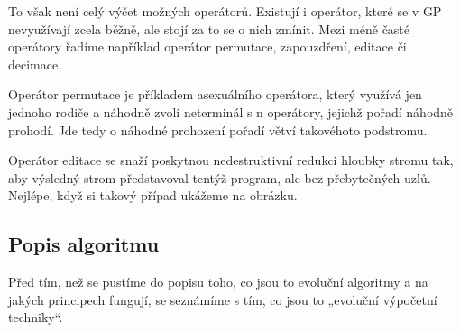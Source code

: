 \documentclass[bc,male,java,dept460]{diploma}		%
\begin{document}
To však není celý výčet možných operátorů. Existují i operátor, které se v GP nevyužívají zcela běžně, ale stojí za to se o nich zmínit. Mezi méně časté operátory řadíme například operátor permutace, zapouzdření, editace či decimace.

Operátor permutace je příkladem asexuálního operátora, který využívá jen jednoho rodiče a náhodně zvolí neterminál s n operátory, jejichž pořadí náhodně prohodí. Jde tedy o náhodné prohození pořadí větví takovéhoto podstromu.

Operátor editace se snaží poskytnou nedestruktivní redukci hloubky stromu tak, aby výsledný strom představoval tentýž program, ale bez přebytečných uzlů. Nejlépe, když si takový případ ukážeme na obrázku.


\subsection{Popis algoritmu}
Před tím, než se pustíme do popisu toho, co jsou to evoluční algoritmy a na jakých principech fungují, se seznámíme s tím, co jsou to „evoluční výpočetní techniky“.
\end{document}

